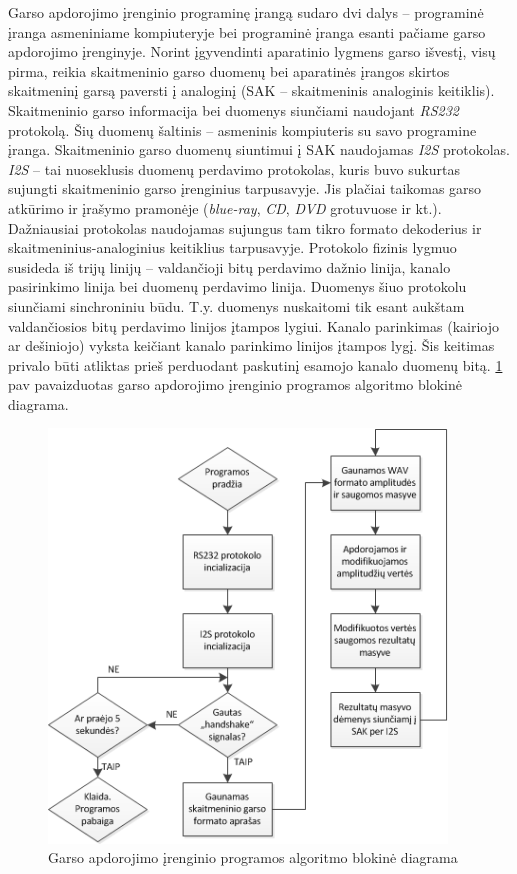 \documentclass[]{vgtuef}
\begin{document}
Garso apdorojimo įrenginio programinę įrangą sudaro dvi dalys – programinė įranga asmeniniame kompiuteryje bei programinė įranga esanti pačiame garso apdorojimo įrenginyje. Norint įgyvendinti aparatinio lygmens garso išvestį, visų pirma, reikia skaitmeninio garso duomenų bei aparatinės įrangos skirtos skaitmeninį garsą paversti į analoginį (SAK – skaitmeninis analoginis keitiklis). Skaitmeninio garso informacija bei duomenys siunčiami naudojant \textit{RS232} protokolą. Šių duomenų šaltinis – asmeninis kompiuteris su savo programine įranga. Skaitmeninio garso duomenų siuntimui į SAK naudojamas \textit{I2S} protokolas. \textit{I2S} – tai nuoseklusis duomenų perdavimo protokolas, kuris buvo sukurtas sujungti skaitmeninio garso įrenginius tarpusavyje. Jis plačiai taikomas garso atkūrimo ir įrašymo pramonėje (\textit{blue-ray}, \textit{CD}, \textit{DVD} grotuvuose ir kt.). Dažniausiai protokolas naudojamas sujungus tam tikro formato dekoderius ir skaitmeninius-analoginius keitiklius tarpusavyje. Protokolo fizinis lygmuo susideda iš trijų linijų – valdančioji bitų perdavimo dažnio linija, kanalo pasirinkimo linija bei duomenų perdavimo linija. Duomenys šiuo protokolu siunčiami sinchroniniu būdu. T.y. duomenys nuskaitomi tik esant aukštam valdančiosios bitų perdavimo linijos įtampos lygiui. Kanalo parinkimas (kairiojo ar dešiniojo) vyksta keičiant kanalo parinkimo linijos įtampos lygį. Šis keitimas privalo būti atliktas prieš perduodant paskutinį esamojo kanalo duomenų bitą. \ref{fig:garso_apdorojimas} pav pavaizduotas garso apdorojimo įrenginio programos algoritmo blokinė diagrama.

\begin{figure}[!ht]
  \centering
  \includegraphics[width=400px]{img/garso_apdorojimas.png}
  \caption{Garso apdorojimo įrenginio programos algoritmo blokinė diagrama}
  \label{fig:garso_apdorojimas}
\end{figure}
\end{document}
